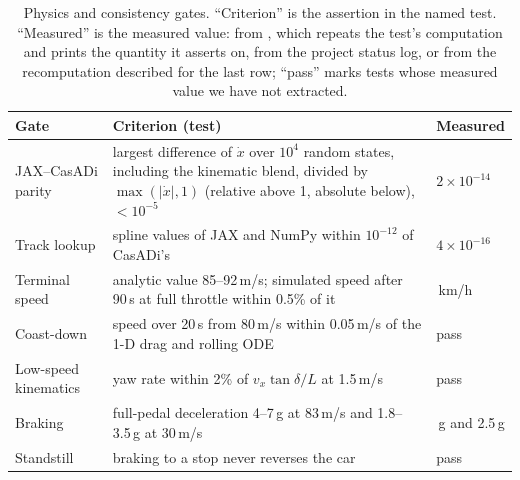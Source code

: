 \begin{table}[t]
\centering
\small
\caption{Physics and consistency gates. ``Criterion'' is the assertion in the named test.
``Measured'' is the measured value: from , which repeats
the test's computation and prints the quantity it asserts on, from the project status
log, or from the recomputation described for the last row; ``pass'' marks tests whose
measured value we have not extracted.}
\label{tab:gates}
\begin{tabularx}{\linewidth}{@{}>{\raggedright\arraybackslash}p{2.6cm}>{\raggedright\arraybackslash}X>{\raggedright\arraybackslash}p{2.6cm}@{}}
\toprule
Gate & Criterion (test) & Measured \\
\midrule
JAX--CasADi parity & largest difference of $\dot x$ over $10^4$ random states, including
the kinematic blend, divided by $\max(|\dot x|, 1)$ (relative above 1, absolute below),
$< 10^{-5}$ & $2\times10^{-14}$ \\
Track lookup & spline values of JAX and NumPy within $10^{-12}$ of CasADi's & $4\times10^{-16}$ \\
Terminal speed & analytic value 85--92\,m/s; simulated speed after 90\,s at full throttle
within 0.5\% of it & 315\,km/h \\
Coast-down & speed over 20\,s from 80\,m/s within 0.05\,m/s of the 1-D drag and rolling
ODE & pass \\
Low-speed kinematics & yaw rate within 2\% of $v_x\tan\delta/L$ at 1.5\,m/s & pass \\
Braking & full-pedal deceleration 4--7\,g at 83\,m/s and 1.8--3.5\,g at 30\,m/s &
6.4\,g and 2.5\,g \\
Standstill & braking to a stop never reverses the car & pass \\

\end{tabularx}
\end{table}
